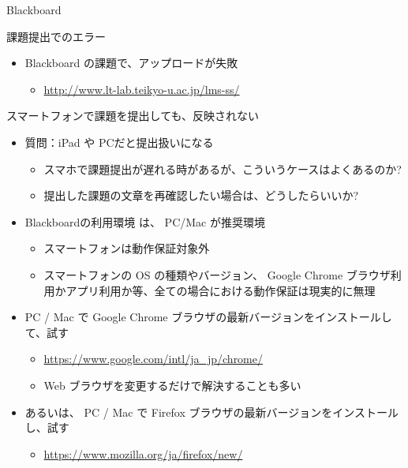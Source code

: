 \documentclass[a4j,10pt]{jsarticle}
\begin{document}
{\begin{frame}[label={sec:org166405d},fragile]{Blackboard}
\begin{block}{課題提出でのエラー}
\begin{itemize}
\begin{itemize}
\item 内容を見たら、すべて白紙の状態で提出となってしまっていた
\end{itemize}
\par
\item Blackboard の課題で、アップロードが失敗
\begin{itemize}
\item \url{http://www.lt-lab.teikyo-u.ac.jp/lms-ss/}
\end{itemize}
\end{itemize}
\end{block}
\par
\begin{block}{スマートフォンで課題を提出しても、反映されない}
\begin{itemize}
\item 質問：iPad や PCだと提出扱いになる
\begin{itemize}
\item スマホで課題提出が遅れる時があるが、こういうケースはよくあるのか?
\item 提出した課題の文章を再確認したい場合は、どうしたらいいか?
\end{itemize}
\par
\item Blackboardの利用環境 は、 \alert{PC/Mac が推奨環境}
\begin{itemize}
\item スマートフォンは動作保証対象外
\item スマートフォンの OS の種類やバージョン、 Google Chrome ブラウザ利用かアプリ利用か等、全ての場合における動作保証は現実的に無理
\end{itemize}
\par
\item PC / Mac で Google Chrome ブラウザの最新バージョンをインストールして、試す
\begin{itemize}
\item \url{https://www.google.com/intl/ja\_jp/chrome/}
\item Web ブラウザを変更するだけで解決することも多い
\end{itemize}
\par
\item あるいは、 PC / Mac で Firefox ブラウザの最新バージョンをインストールし、試す
\begin{itemize}
\item \url{https://www.mozilla.org/ja/firefox/new/}
\end{itemize}
\end{itemize}
\par
\begin{verbatim}


\end{verbatim}
\end{block}
\end{frame}}
\end{document}
